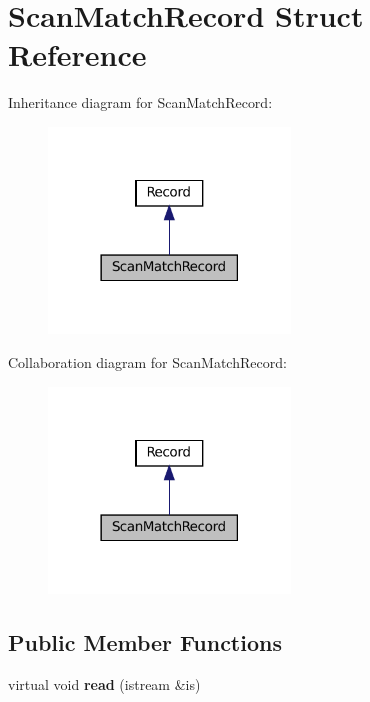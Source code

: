 \hypertarget{structScanMatchRecord}{}\section{Scan\+Match\+Record Struct Reference}
\label{structScanMatchRecord}


Inheritance diagram for Scan\+Match\+Record\+:
\nopagebreak
\begin{figure}[H]
\begin{center}
\leavevmode
\includegraphics[width=182pt]{structScanMatchRecord__inherit__graph}
\end{center}
\end{figure}


Collaboration diagram for Scan\+Match\+Record\+:
\nopagebreak
\begin{figure}[H]
\begin{center}
\leavevmode
\includegraphics[width=182pt]{structScanMatchRecord__coll__graph}
\end{center}
\end{figure}
\subsection*{Public Member Functions}
\begin{DoxyCompactItemize}
\item 
\mbox{\label{structScanMatchRecord_a9b223eb1dcf6e69f979ab105d08be234}} 
virtual void {\bfseries read} (istream \&is)
\end{DoxyCompactItemize}
